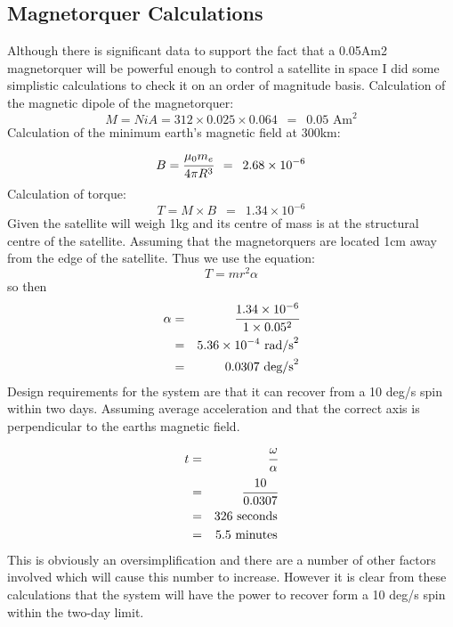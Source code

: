 \subsection{Magnetorquer Calculations}
Although there is significant data to support the fact that a 0.05Am2 magnetorquer will be powerful enough to control a satellite in space I did some simplistic calculations to check it on an order of magnitude basis. Calculation of the magnetic dipole of the magnetorquer:
\[
M = NiA = 312\times0.025\times0.064 \,\,\,=\,\,\, 0.05 \text{ Am}^2
\]
\noindent
Calculation of the minimum earth’s magnetic field at 300km:
\[
B = \cfrac{\mu_0 m_e}{4\pi R^3} \,\,\, = \,\,\, 2.68\times 10^{-6}
\]
\noindent
Calculation of torque:
\[
T = M\times B \,\,\, = \,\,\, 1.34\times 10^{-6}
\]
\noindent
Given the satellite will weigh 1kg and its centre of mass is at the structural centre of the satellite.  Assuming that the magnetorquers are located 1cm away from the edge of the satellite.  Thus we use the equation:
\[
T = mr^2\alpha
\]
\noindent
so then
\begin{eqnarray}
    \alpha &=& \cfrac{1.34\times 10^{-6}}{1\times0.05^2} \\
    &=& 5.36\times 10^{-4} \text{ rad/s}^2 \\
    &=& 0.0307 \text{ deg/s}^2
\end{eqnarray}
\noindent
Design requirements for the system are that it can recover from a 10 deg/s spin within two days.  Assuming average acceleration and that the correct axis is perpendicular to the earths magnetic field.
\begin{eqnarray}
    t &=& \cfrac{\omega}{\alpha} \\
    &=& \cfrac{10}{0.0307} \\
    &=& 326 \text{ seconds} \\
    &=& 5.5 \text{ minutes}
\end{eqnarray}
\noindent
This is obviously an oversimplification and there are a number of other factors involved which will cause this number to increase.  However it is clear from these calculations that the system will have the power to recover form a 10 deg/s spin within the two-day limit.
